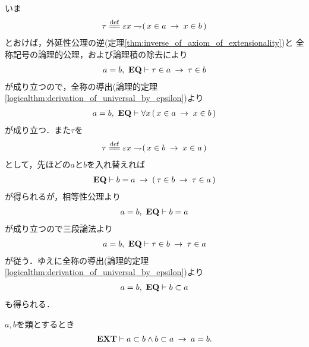 	\begin{sketch}
		いま
		\begin{align}
			\tau \defeq \varepsilon x \negation (\, x \in a \rarrow x \in b\, )
		\end{align}
		とおけば，外延性公理の逆(定理\ref{thm:inverse_of_axiom_of_extensionality})と
		全称記号の論理的公理，および論理積の除去により
		\begin{align}
			a = b,\ \mbox{{\bf EQ}} \vdash \tau \in a \hspace{0.25em}\rightarrow\hspace{0.25em} \tau \in b
		\end{align}
		が成り立つので，全称の導出(論理的定理\ref{logicalthm:derivation_of_universal_by_epsilon})より
		\begin{align}
			a = b,\ \mbox{{\bf EQ}} \vdash \forall x\, (\, x \in a \hspace{0.25em}\rightarrow\hspace{0.25em} x \in b\, )
		\end{align}
		が成り立つ．また$\tau$を
		\begin{align}
			\tau \defeq \varepsilon x \negation (\, x \in b \rarrow x \in a\, )
		\end{align}
		として，先ほどの$a$と$b$を入れ替えれば
		\begin{align}
			\mbox{{\bf EQ}} \vdash b = a \hspace{0.25em}\rightarrow\hspace{0.25em} (\, \tau \in b \hspace{0.25em}\rightarrow\hspace{0.25em} \tau \in a\, )
		\end{align}
		が得られるが，相等性公理より
		\begin{align}
			a = b,\ \mbox{{\bf EQ}} \vdash b = a
		\end{align}
		が成り立つので三段論法より
		\begin{align}
			a = b,\ \mbox{{\bf EQ}} \vdash \tau \in b \hspace{0.25em}\rightarrow\hspace{0.25em} \tau \in a
		\end{align}
		が従う．ゆえに全称の導出(論理的定理\ref{logicalthm:derivation_of_universal_by_epsilon})より
		\begin{align}
			a = b,\ \mbox{{\bf EQ}} \vdash b \subset a
		\end{align}
		も得られる．
		\QED
	\end{sketch}
	
	\begin{screen}
		\begin{thm}[互いに相手を包含する類同士は等しい]
		\label{thm:mutually_including_classes_are_equivalent}
			$a,b$を類とするとき
			\begin{align}
				\mbox{{\bf EXT}} \vdash a \subset b \wedge b \subset a \hspace{0.25em}\rightarrow\hspace{0.25em} a = b.
			\end{align}
		\end{thm}
	\end{screen}
	
